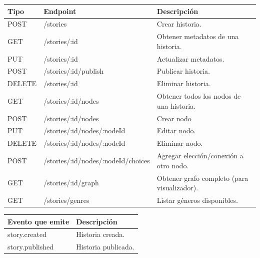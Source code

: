 \documentclass[a4paper,11 pt]{article}
\begin{document}
\begin{itemize}
    \begin{table}[H]
        \footnotesize{
        \centering
        \begin{tabular}{|M{0.1\textwidth}|M{0.3\textwidth}|M{0.4\textwidth}|}
            \hline
            \textbf{Tipo} &\textbf{Endpoint} & \textbf{Descripción} \\
            \hline
             POST & /stories & Crear historia.  \\
             \hline
             GET &/stories/:id & Obtener metadatos de una historia. \\
             \hline
             PUT & /stories/:id & Actualizar metadatos. \\
             \hline
             POST & /stories/:id/publish & Publicar historia.\\
             \hline
             DELETE &/stories/:id & Eliminar historia.\\
             \hline
             GET &/stories/:id/nodes & Obtener todos los nodos de una historia.\\
             \hline
             POST &/stories/:id/nodes & Crear nodo\\
             \hline
             PUT & /stories/:id/nodes/:nodeId & Editar nodo.\\
             \hline
             DELETE & /stories/:id/nodes/:nodeId & Eliminar nodo.\\
             \hline
             POST & /stories/:id/nodes/:nodeId/choices & Agregar elección/conexión a otro nodo.\\
             \hline
             GET & /stories/:id/graph & Obtener grafo completo (para visualizador).\\
             \hline
             GET & /stories/genres & Listar géneros disponibles.\\
             \hline
        \end{tabular}
        \label{t13}
        }
    \end{table}

    \begin{table}[H]
        \footnotesize{
        \centering
        \begin{tabular}{|M{0.4\textwidth}|M{0.5\textwidth}|}
            \hline
            \textbf{Evento que emite} & \textbf{Descripción} \\
            \hline
             story.created & Historia creada.  \\
             \hline
             story.published & Historia publicada.  \\
             \hline
        \end{tabular}
        \label{t13}
        }
    \end{table}
    

\end{itemize}
\end{document}
